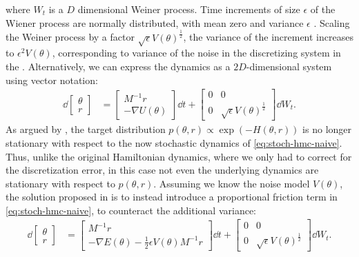 where $W_t$ is a $D$ dimensional Weiner process.
Time increments of size $\epsilon$ of the Wiener process are normally distributed, with mean zero and variance $\epsilon$ \autocite{ottinger_stochastic_1996}.
Scaling the Weiner process by a factor $\sqrt{\epsilon} V(\theta)^{\frac{1}{2}}$, the variance of the increment increases to $\epsilon^2 V(\theta)$, corresponding to variance of the noise in the  
discretizing system in the . 
Alternatively, we can express the dynamics as a $2D$-dimensional system using vector notation:
\begin{align} \label{eq:stoch-hmc-naive}
    \dd{\begin{bmatrix}\theta \\ r \end{bmatrix}} &= 
    \begin{bmatrix}
        M^{-1}r \\ -\nabla{U}(\theta) 
    \end{bmatrix} \dd{t} + \begin{bmatrix}
        0 & 0 \\ 
        0 & \sqrt{\epsilon} V(\theta)^{\frac{1}{2}}
    \end{bmatrix} \dd{W_t}.
\end{align}
As argued by \autocite{chen_stochastic_2014}, the target distribution $p(\theta, r)\propto \exp(-H(\theta, r))$ is no longer stationary with respect to the now stochastic dynamics of \cref{eq:stoch-hmc-naive}.
Thus, unlike the original Hamiltonian dynamics, where we only had to correct for the discretization error, in this case not even the underlying dynamics are stationary with respect to $p(\theta, r)$.
Assuming we know the noise model $V(\theta)$, the solution proposed in \autocite{chen_stochastic_2014} is to instead introduce a proportional friction term in \cref{eq:stoch-hmc-naive}, to counteract the additional variance:
\begin{align} \label{eq:stoch-hmc-w-friction}
    \dd{\begin{bmatrix}\theta \\ r \end{bmatrix}} &= 
    \begin{bmatrix}
        M^{-1}r \\ -\nabla{E}(\theta)-\frac{1}{2}\epsilon V(\theta)M^{-1}r
    \end{bmatrix} \dd{t} + \begin{bmatrix}
        0 & 0 \\ 
        0 & \sqrt{\epsilon} V(\theta)^{\frac{1}{2}}
    \end{bmatrix} \dd{W_t}.
\end{align}
